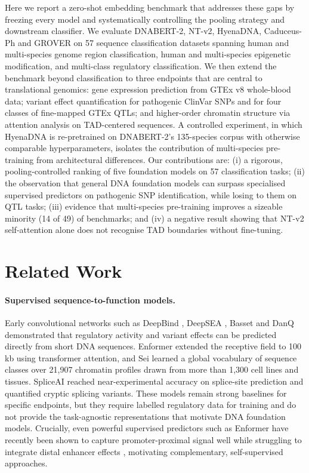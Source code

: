 \documentclass[11pt,a4paper]{article}
\begin{document}
Here we report a zero-shot embedding benchmark that addresses these gaps by freezing every model and systematically controlling the pooling strategy and downstream classifier. We evaluate DNABERT-2, NT-v2, HyenaDNA, Caduceus-Ph and GROVER on 57 sequence classification datasets spanning human and multi-species genome region classification, human and multi-species epigenetic modification, and multi-class regulatory classification. We then extend the benchmark beyond classification to three endpoints that are central to translational genomics: gene expression prediction from GTEx v8 whole-blood data; variant effect quantification for pathogenic ClinVar SNPs and for four classes of fine-mapped GTEx QTLs; and higher-order chromatin structure via attention analysis on TAD-centered sequences. A controlled experiment, in which HyenaDNA is re-pretrained on DNABERT-2's 135-species corpus with otherwise comparable hyperparameters, isolates the contribution of multi-species pre-training from architectural differences. Our contributions are: (i) a rigorous, pooling-controlled ranking of five foundation models on 57 classification tasks; (ii) the observation that general DNA foundation models can surpass specialised supervised predictors on pathogenic SNP identification, while losing to them on QTL tasks; (iii) evidence that multi-species pre-training improves a sizeable minority (14 of 49) of benchmarks; and (iv) a negative result showing that NT-v2 self-attention alone does not recognise TAD boundaries without fine-tuning.

\section{Related Work}

\paragraph{Supervised sequence-to-function models.}
Early convolutional networks such as DeepBind \citep{alipanahi2015deepbind}, DeepSEA \citep{zhou2015deepsea}, Basset \citep{kelley2016basset} and DanQ \citep{quang2016danq} demonstrated that regulatory activity and variant effects can be predicted directly from short DNA sequences. Enformer \citep{avsec2021enformer} extended the receptive field to 100 kb using transformer attention, and Sei \citep{chen2022sei} learned a global vocabulary of sequence classes over 21{,}907 chromatin profiles drawn from more than 1{,}300 cell lines and tissues. SpliceAI \citep{jaganathan2019spliceai} reached near-experimental accuracy on splice-site prediction and quantified cryptic splicing variants. These models remain strong baselines for specific endpoints, but they require labelled regulatory data for training and do not provide the task-agnostic representations that motivate DNA foundation models. Crucially, even powerful supervised predictors such as Enformer have recently been shown to capture promoter-proximal signal well while struggling to integrate distal enhancer effects \citep{karollus2023enformer_limits}, motivating complementary, self-supervised approaches.
\end{document}
